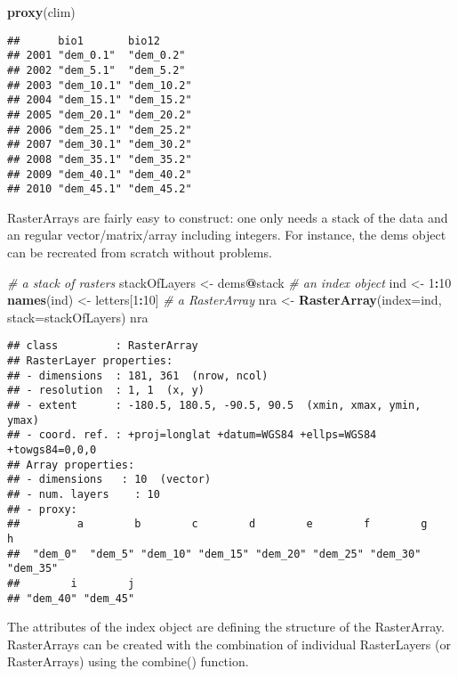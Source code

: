 \documentclass[]{article}
\newenvironment{Shaded}{\begin{snugshade}}{\end{snugshade}}
\newcommand{\CommentTok}[1]{\textcolor[rgb]{0.56,0.35,0.01}{\textit{#1}}}
\newcommand{\DataTypeTok}[1]{\textcolor[rgb]{0.13,0.29,0.53}{#1}}
\newcommand{\DecValTok}[1]{\textcolor[rgb]{0.00,0.00,0.81}{#1}}
\newcommand{\KeywordTok}[1]{\textcolor[rgb]{0.13,0.29,0.53}{\textbf{#1}}}
\newcommand{\NormalTok}[1]{#1}
\newcommand{\OperatorTok}[1]{\textcolor[rgb]{0.81,0.36,0.00}{\textbf{#1}}}
\newcommand{\StringTok}[1]{\textcolor[rgb]{0.31,0.60,0.02}{#1}}
\begin{document}
\begin{Shaded}
\begin{Highlighting}[]
\KeywordTok{proxy}\NormalTok{(clim)}
\end{Highlighting}
\end{Shaded}

\begin{verbatim}
##      bio1       bio12     
## 2001 "dem_0.1"  "dem_0.2" 
## 2002 "dem_5.1"  "dem_5.2" 
## 2003 "dem_10.1" "dem_10.2"
## 2004 "dem_15.1" "dem_15.2"
## 2005 "dem_20.1" "dem_20.2"
## 2006 "dem_25.1" "dem_25.2"
## 2007 "dem_30.1" "dem_30.2"
## 2008 "dem_35.1" "dem_35.2"
## 2009 "dem_40.1" "dem_40.2"
## 2010 "dem_45.1" "dem_45.2"
\end{verbatim}

RasterArrays are fairly easy to construct: one only needs a stack of the
data and an regular vector/matrix/array including integers. For
instance, the dems object can be recreated from scratch without
problems.

\begin{Shaded}
\begin{Highlighting}[]
\CommentTok{# a stack of rasters}
\NormalTok{stackOfLayers <-}\StringTok{ }\NormalTok{dems}\OperatorTok{@}\NormalTok{stack}
\CommentTok{# an index object}
\NormalTok{ind <-}\StringTok{ }\DecValTok{1}\OperatorTok{:}\DecValTok{10}
\KeywordTok{names}\NormalTok{(ind) <-}\StringTok{ }\NormalTok{letters[}\DecValTok{1}\OperatorTok{:}\DecValTok{10}\NormalTok{]}
\CommentTok{# a RasterArray}
\NormalTok{nra  <-}\StringTok{ }\KeywordTok{RasterArray}\NormalTok{(}\DataTypeTok{index=}\NormalTok{ind, }\DataTypeTok{stack=}\NormalTok{stackOfLayers)}
\NormalTok{nra}
\end{Highlighting}
\end{Shaded}

\begin{verbatim}
## class         : RasterArray 
## RasterLayer properties: 
## - dimensions  : 181, 361  (nrow, ncol)
## - resolution  : 1, 1  (x, y)
## - extent      : -180.5, 180.5, -90.5, 90.5  (xmin, xmax, ymin, ymax)
## - coord. ref. : +proj=longlat +datum=WGS84 +ellps=WGS84 +towgs84=0,0,0 
## Array properties: 
## - dimensions   : 10  (vector)
## - num. layers    : 10
## - proxy:
##         a        b        c        d        e        f        g        h 
##  "dem_0"  "dem_5" "dem_10" "dem_15" "dem_20" "dem_25" "dem_30" "dem_35" 
##        i        j 
## "dem_40" "dem_45"
\end{verbatim}

The attributes of the index object are defining the structure of the
RasterArray. RasterArrays can be created with the combination of
individual RasterLayers (or RasterArrays) using the combine() function.
\end{document}
